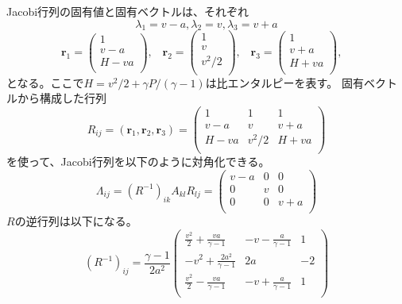 Jacobi行列の固有値と固有ベクトルは、それぞれ
\begin{equation}
    \lambda_1 = v - a, \lambda_2 = v, \lambda_3 = v+a 
\end{equation}
\begin{equation}
\bm{ r}_1 = 
\left(
        \begin{array}{ccc}
         1  \\
         v-a \\
         H - va \\
        \end{array}
\right),\;\;\;
\bm{ r}_2 = 
\left(
        \begin{array}{ccc}
         1  \\
         v \\
         v^2/2 \\
        \end{array}
\right),\;\;\;
\bm{ r}_3 = 
\left(
        \begin{array}{ccc}
         1  \\
         v+a \\
         H + va \\
        \end{array}
\right),\;\;\;
\end{equation}
となる。ここで$H=v^2/2 + \gamma P/(\gamma-1)$は比エンタルピーを表す。
固有ベクトルから構成した行列
\begin{equation}
    R_{ij} = \left( \bm{ r}_1, \bm{ r}_2, \bm{ r}_3 \right)
    = \left( 
        \begin{array}{ccc}
         1  & 1 & 1 \\
         v-a & v & v+a \\
         H - va & v^2/2 & H + va\\
        \end{array}
    \right)
\end{equation}
を使って、Jacobi行列を以下のように対角化できる。
\begin{equation}
\Lambda_{ij} = 
(R^{-1})_{ik} A_{kl} R_{lj} = 
   \left( 
        \begin{array}{ccc}
         v-a  & 0 & 0 \\
         0 & v & 0 \\
         0 & 0 & v + a\\
        \end{array}
    \right)
\end{equation}
$R$の逆行列は以下になる。
\begin{equation}
    (R^{-1})_{ij} = \frac{\gamma-1}{2a^2}\left( 
        \begin{array}{ccc}
        \displaystyle \frac{v^2}{2} + \frac{va}{\gamma-1}  & \displaystyle  -v - \frac{a}{\gamma-1} & 1 \\
          \displaystyle -v^2 + \frac{2a^2}{\gamma-1} & 2a & -2  \\
       \displaystyle    \frac{v^2}{2} - \frac{va}{\gamma-1}  &  \displaystyle -v + \frac{a}{\gamma-1} & 1 \\
        \end{array}
    \right)
\end{equation}
